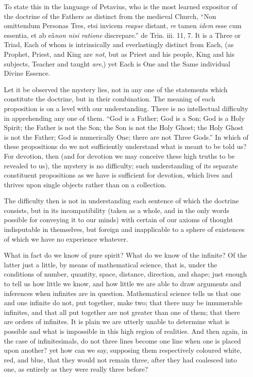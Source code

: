 To state this in the language of Petavius, who is
the most learned expositor of the doctrine of the Fathers as distinct
from the medieval Church, ``Non omittendum Personas Tres, etsi invicem \emph{reapse}
distant, \emph{re} tamen \emph{idem} esse cum essentia, et ab eâ\emph{non nisi ratione} discrepare.'' de Trin. iii. 11, 7. It is a Three
or Triad, Each of whom is intrinsically and everlastingly distinct
from Each, (as Prophet, Priest, and King are \emph{not}, but as Priest
and his people, King and his subjects, Teacher and taught \emph{are},)
yet Each is One and the Same individual Divine Essence.

Let it be observed the mystery lies, not in any
one of the statements which constitute the doctrine, but in
their combination. The meaning of each proposition is on a level with
our understanding. There is no intellectual difficulty in apprehending
any one of them. ``God is a Father; God is a Son; God is a Holy Spirit;
the Father is not the Son; the Son is not the Holy Ghost; the Holy
Ghost is not the Father; God is numerically One; there are not Three
Gods.'' In which of these propositions do we not sufficiently
understand what is meant to be told us? For devotion, then (and for
devotion we may conceive these high truths to be revealed to us), the
mystery is no difficulty; such understanding of its separate
constituent propositions as we have is sufficient for devotion, which
lives and thrives upon single objects rather than on a collection.

The difficulty then is not in understanding each
sentence of which the doctrine consists, but in its incompatibility
(taken as a whole, and in the only words possible for conveying it to
our minds) with certain of our axioms of thought indisputable in
themselves, but foreign and inapplicable to a sphere of existences of
which we have no experience whatever.

What in fact do we know of pure spirit? What do
we know of the infinite? Of the latter just a little, by means of
mathematical science, that is, under the conditions of number,
quantity, space, distance, direction, and shape; just enough to tell
us how little we know, and how little we are able to draw arguments
and inferences when infinites are in question. Mathematical science
tells us that one and one infinite do not, put together, make two;
that there may be innumerable infinites, and that all put
together are not greater than one of them; that there are orders of
infinites. It is plain we are utterly unable to determine what is
possible and what is impossible in this high region of realities. And
then again, in the case of infinitesimals, do not three lines become
one line when one is placed upon another? yet how can we say,
supposing them respectively coloured white, red, and blue, that they
would not remain three, after they had coalesced into one, as entirely
as they were really three before?

